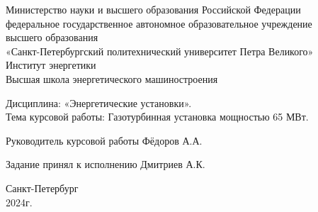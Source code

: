 \begin{titlepage}
  \begin{center}
    Министерство науки и высшего образования Российской Федерации \\
    федеральное государственное автономное образовательное учреждение\\
    высшего образования\\
    «Санкт-Петербургский политехнический университет Петра Великого»\\
    Институт энергетики\\
    Высшая школа энергетического машиностроения
  \end{center}

  \vspace{3cm}

  \begin{center}
    \begin{large}
      Дисциплина: «Энергетические установки».\\
      \vspace{1cm}
      Тема курсовой работы: Газотурбинная установка мощностью 65 МВт.
    \end{large}
  \end{center}

  \vspace{5cm}

  \begin{center}
    Руководитель курсовой работы \hrulefill Фёдоров А.А.

    \vspace{0.5cm}

    Задание принял к исполнению \hrulefill Дмитриев А.К.
  \end{center}

  \vfill
  \begin{center}
    Санкт-Петербург\\
    2024г.
  \end{center}
\end{titlepage}

